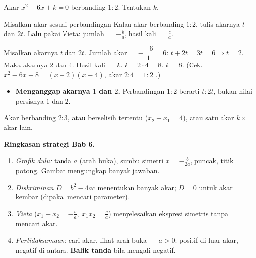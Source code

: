 \begin{soalbox}{}
Akar $x^2-6x+k=0$ berbanding $1:2$. Tentukan $k$.
\end{soalbox}

\begin{ingat}{Misalkan akar sesuai perbandingan}
Kalau akar berbanding $1:2$, tulis akarnya $t$ dan $2t$. Lalu pakai Vieta:
jumlah $=-\frac ba$, hasil kali $=\frac ca$.
\end{ingat}

\jawab
{} Misalkan akarnya $t$ dan $2t$.
 Jumlah akar $=-\dfrac{-6}{1}=6$: $t+2t=3t=6\Rightarrow t=2$.
 Maka akarnya $2$ dan $4$. Hasil kali $=k$: $k=2\cdot4=8$.
\jadi $k=8$. (Cek: $x^2-6x+8=(x-2)(x-4)$, akar $2:4=1:2$ \checkmark.)

\begin{jebakan}
\begin{itemize}[leftmargin=*,topsep=2pt]
  \item \textbf{Menganggap akarnya $1$ dan $2$.} Perbandingan $1:2$ berarti
  $t:2t$, bukan nilai persisnya $1$ dan $2$.
\end{itemize}
\end{jebakan}

\begin{variasi}
Akar berbanding $2:3$, atau berselisih tertentu ($x_2-x_1=4$), atau satu akar
$k\times$ akar lain.
\end{variasi}

\begin{tips}
\textbf{Ringkasan strategi Bab 6.}
\begin{enumerate}[leftmargin=*,topsep=2pt]
  \item \emph{Grafik dulu:} tanda $a$ (arah buka), sumbu simetri
  $x=-\frac{b}{2a}$, puncak, titik potong. Gambar mengungkap banyak jawaban.
  \item \emph{Diskriminan} $D=b^2-4ac$ menentukan banyak akar; $D=0$ untuk akar
  kembar (dipakai mencari parameter).
  \item \emph{Vieta} ($x_1+x_2=-\frac ba,\ x_1x_2=\frac ca$) menyelesaikan
  ekspresi simetris tanpa mencari akar.
  \item \emph{Pertidaksamaan:} cari akar, lihat arah buka --- $a>0$: positif di
  luar akar, negatif di antara. \textbf{Balik tanda} bila mengali negatif.
\end{enumerate}
\end{tips}


